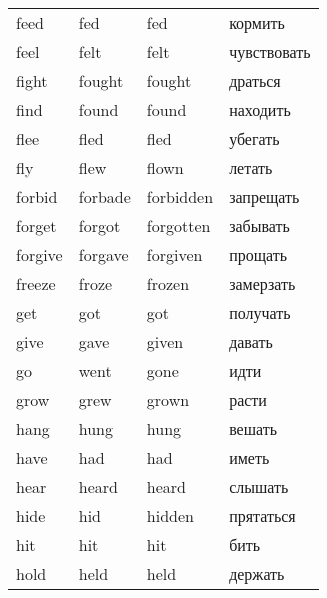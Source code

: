 \begin{longtable}{| m{} | m{} | m{} | m{} |}
    feed               & fed                 & fed                     & кормить             \\
    feel               & felt                & felt                    & чувствовать         \\
    fight              & fought              & fought                  & драться             \\
    find               & found               & found                   & находить            \\
    flee               & fled                & fled                    & убегать             \\
    fly                & flew                & flown                   & летать              \\
    forbid             & forbade             & forbidden               & запрещать           \\
    forget             & forgot              & forgotten               & забывать            \\
    forgive            & forgave             & forgiven                & прощать             \\
    freeze             & froze               & frozen                  & замерзать           \\
    get                & got                 & got                     & получать            \\
    give               & gave                & given                   & давать              \\
    go                 & went                & gone                    & идти                \\
    grow               & grew                & grown                   & расти               \\
    hang               & hung                & hung                    & вешать              \\
    have               & had                 & had                     & иметь               \\
    hear               & heard               & heard                   & слышать             \\
    hide               & hid                 & hidden                  & прятаться           \\
    hit                & hit                 & hit                     & бить                \\
    hold               & held                & held                    & держать             \\

\end{longtable}
